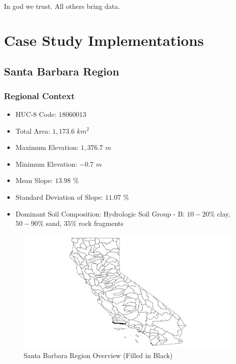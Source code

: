 \begin{savequote}[75mm]
In god we trust. 
All others bring data. 
\end{savequote}

\chapter{Case Study Implementations}
\label{Chapter 4}

\newpage

\section{Santa Barbara Region}

    \subsection{Regional Context}
    
    \begin{itemize}
      \setlength{\itemsep}{0cm}
      \setlength{\parskip}{0cm}
        \item HUC-8 Code: $18060013$
        \item Total Area: $1,173.6$ $km^2$
        \item Maximum Elevation: $1,376.7$ $m$
        \item Minimum Elevation: $-0.7$ $m$
        \item Mean Slope: $13.98$ $\%$
        \item Standard Deviation of Slope: $11.07$ $\%$
        \item Dominant Soil Composition: Hydrologic Soil Group - B: $10-20\%$ clay, $50-90\%$ sand, $35\%$ rock fragments
    \end{itemize}
    
        \begin{figure}[!h]
            \begin{center}
            \includegraphics[width=5.5in]{figures/SantaBarbara_Overview.png}   
            \caption{Santa Barbara Region Overview (Filled in Black)}
            \label{fig:SBoverview}
            \end{center}
        \end{figure}

